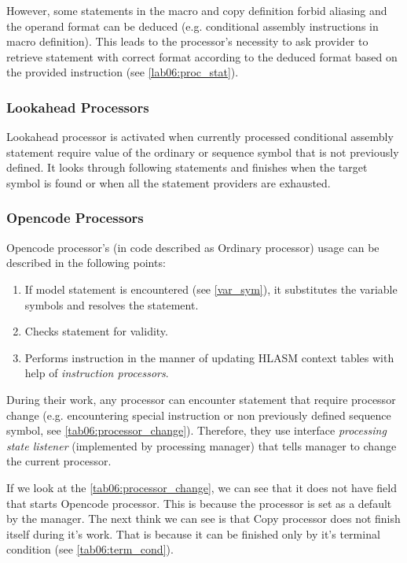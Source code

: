 However, some statements in the macro and copy definition forbid aliasing and the operand format can be deduced (e.g. conditional assembly instructions in macro definition). This leads to the processor's necessity to ask provider to retrieve statement with correct format according to the deduced format based on the provided instruction  (see \cref{lab06:proc_stat}).

\subsubsection{Lookahead Processors}

Lookahead processor is activated when currently processed conditional assembly statement require value of the ordinary or sequence symbol that is not previously defined. It looks through following statements and finishes when the target symbol is found or when all the statement providers are exhausted.

\subsubsection{Opencode Processors}

Opencode processor's (in code described as Ordinary processor) usage can be described in the following points:
\begin{enumerate}
	\item If model statement is encountered (see \cref{var_sym}), it substitutes the variable symbols and resolves the statement.
	\item Checks statement for validity.
	\item Performs instruction in the manner of updating HLASM context tables with help of \emph{instruction processors}.
\end{enumerate}

\vspace{0.5cm}

During their work, any processor can encounter statement that require processor change (e.g. encountering special instruction or non previously defined sequence symbol, see \cref{tab06:processor_change}). Therefore, they use interface \emph{processing state listener} (implemented by processing manager) that tells manager to change the current processor.

If we look at the \cref{tab06:processor_change}, we can see that it does not have field that starts Opencode processor. This is because the processor is set as a default by the manager. The next think we can see is that Copy processor does not finish itself during it's work. That is because it  can be finished only by it's terminal condition (see \cref{tab06:term_cond}). 

